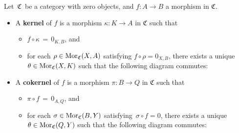 \vskip 0.5cm
\begin{definition}
\mbox{}
\vskip 0.15cm
\noindent
Let \,$\mathfrak{C}$\, be a category with zero objects, and $f : A \longrightarrow B$ a morphism in $\mathfrak{C}$.
\begin{itemize}
\item
	A \textbf{kernel} of $f$ is a morphism $\kappa : K \longrightarrow A$ in $\mathfrak{C}$ such that
	\begin{itemize}
	\item
		\vskip -0.15cm
		$f \circ \kappa \,=\, 0_{K,B}$, and
	\item
		for each $\rho \in \textnormal{Mor}_{\mathfrak{C}}(X,A)$ satisfying $f \circ \rho = 0_{X,B}$,
		there exists a unique $\theta \in \textnormal{Mor}_{\mathfrak{C}}(X,K)$ such that the following diagram commutes:
		\begin{center}
		\end{center}
	\end{itemize}
\item
	A \textbf{cokernel} of $f$ is a morphism $\pi : B \longrightarrow Q$ in $\mathfrak{C}$ such that
	\begin{itemize}
	\item
		\vskip -0.15cm
		$\pi \circ f \,=\, 0_{A,Q}$, and
	\item
		for each $\sigma \in \textnormal{Mor}_{\mathfrak{C}}(B,Y)$ satisfying \,$\sigma \circ f = 0$,
		there exists a unique $\theta \in \textnormal{Mor}_{\mathfrak{C}}(Q,Y)$ such that the following diagram commutes:
		\begin{center}
		\end{center}
	\end{itemize}
\end{itemize}
\end{definition}


